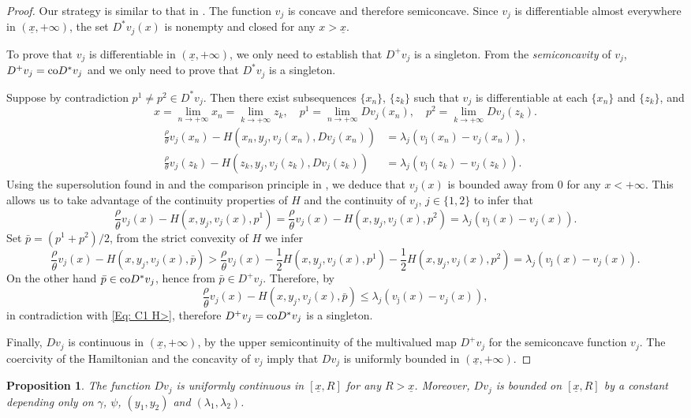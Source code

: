 \documentclass[11pt]{article}
\numberwithin{equation}{section}
\newtheorem{prop}[thm]{Proposition}
\theoremstyle{definition}
\newcommand{\ux}{{\underline x}}
\newcommand{\beq}{\begin{equation}}
\newcommand{\eeq}{\end{equation}}
\newcommand{\g}{\gamma}
\newcommand{\p}{\psi}
\theoremstyle{plain}
\begin{document}
\begin{proof}
Our strategy is similar to that in \cite[Section 5.2, Proposition 5.7]{bardi1997optimal}. The function $v_j$ is concave and therefore semiconcave. Since $v_j$ is differentiable almost everywhere in $(\ux,+\infty)$, the set $D^*v_j(x)$ is nonempty and closed for any $x>\ux$. \par
To prove that $v_j$ is differentiable in $(\ux,+\infty)$, we only need to establish that $D^+v_j$ is a singleton. From the {\textit{semiconcavity}} of $v_j$,  $D^+v_j={\rm{co}}D^*v_j$ and we only need to prove that $D^*v_j$ is a singleton. \par
Suppose by contradiction $p^1\neq p^2\in D^*v_j$. Then there exist subsequences $\{x_n\}$, $\{z_k\}$ such that $v_j$ is differentiable at each $\{x_n\}$ and $\{z_k\}$, and 
$$
x=\lim_{n\to +\infty}x_n=\lim_{k\to +\infty}z_k,\quad p^1=\lim_{n\to +\infty}Dv_j(x_n),\quad p^2=\lim_{k\to +\infty}Dv_j(z_k).
$$
\beq
\begin{aligned}
\frac{\rho}{\theta} v_j(x_n)-H(x_n,y_j,v_j(x_n),Dv_j(x_n))&=\lambda_j (v_{\bar \jmath}(x_n)-v_j(x_n)),\\
\frac{\rho}{\theta} v_j(z_k)-H(z_k,y_j,v_j(z_k),Dv_j(z_k))&=\lambda_j (v_{\bar \jmath}(z_k)-v_j(z_k)).
\end{aligned}
\eeq
Using the supersolution found in  and the comparison principle in , we deduce that $v_j(x)$ is bounded away from $0$ for any $x<+\infty$. This allows us to take advantage of the continuity properties of $H$ and the continuity of $v_j$, $j\in \{1,2\}$ to infer that 
\beq
\frac{\rho}{\theta} v_j(x)-H\left(x,y_j,v_j(x),p^1\right)={}{\frac{\rho}{\theta} v_j(x)}-H\left(x,y_j,v_j(x),p^2\right)=\lambda_j (v_{\bar \jmath}(x)-v_j(x)) .
\eeq
Set $\bar{p}=(p^1+p^2)/2$, from the strict convexity of $H$ we infer 
\beq\label{Eq: C1 H>}
\frac{\rho}{\theta} v_j(x)-H\left(x,y_j,v_j(x),\bar{p}\right)>\frac{\rho}{\theta} v_j(x)-\frac{1}{2}H\left(x,y_j,v_j(x),p^1\right)-\frac{1}{2}H\left(x,y_j,v_j(x),p^2\right)=\lambda_j (v_{\bar \jmath}(x)-v_j(x)) .
\eeq
On the other hand $\bar{p}\in {\rm{co}}D^*v_j$, hence from  $\bar{p}\in D^+v_j$. Therefore, by 
$$
\frac{\rho}{\theta} v_j(x)-H\left(x,y_j,v_j(x),\bar{p}\right)\leq \lambda_j (v_{\bar \jmath}(x)-v_j(x)), 
$$
in contradiction with \eqref{Eq: C1 H>}, therefore $D^+v_j={\rm{co}}D^*v_j$ is a singleton. \par
Finally, $Dv_j$ is continuous in $(\ux,+\infty)$, {}{by} the upper semicontinuity of the multivalued map $D^+v_j$ for the semiconcave function $v_j$. The coercivity of the Hamiltonian and the concavity of $v_j$ imply that $Dv_j$ is uniformly bounded in $(\ux,+\infty)$.
\end{proof}
\begin{prop}\label{Dv UC}
The function $Dv_j$ is uniformly continuous in $[\ux,R]$ for any $R>\ux$. Moreover, $Dv_j$ is bounded on $[\ux,R]$ by a constant depending only on $\g$, $\p$, $(y_1,y_2)$ and $(\lambda_1,\lambda_2)$. 
\end{prop}
\end{document}
